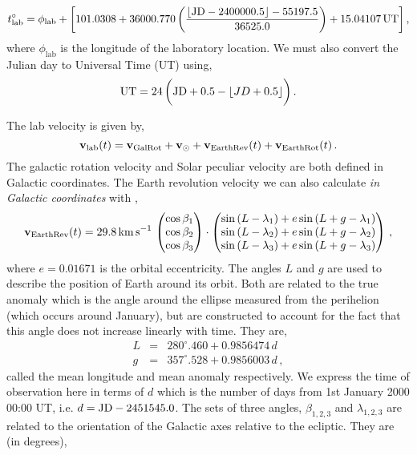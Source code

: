 \begin{equation}
 t^\circ_\textrm{lab} = \phi_\textrm{lab} + \bigg[101.0308
		+ 36000.770\left(\frac{\lfloor\textrm{JD} - 2400000.5\rfloor-55197.5}{36525.0}\right)
		+ 15.04107 \, \textrm{UT}\bigg] \, , \nonumber
\end{equation}
where $\phi_\textrm{lab}$ is the longitude of the laboratory location. We must also convert the Julian day to Universal Time (UT) using,
\begin{equation}
 \textrm{UT} = 24\,\bigg(\textrm{JD}+0.5-\lfloor JD+0.5\rfloor\bigg) \, .
\end{equation}

The lab velocity is given by,
\begin{equation}
\textbf{v}_\textrm{lab}(t) = {\bf v}_{\rm GalRot} + {\bf v}_\odot + {\bf v}_{\rm EarthRev}(t) + {\bf v}_{\rm EarthRot}(t) \, .
\end{equation}
The galactic rotation velocity and Solar peculiar velocity are both defined in Galactic coordinates. The Earth revolution velocity we can also calculate {\it in Galactic coordinates} with \cite{McCabe:2013kea},
\begin{equation}
\textbf{v}_\textrm{\rm EarthRev}(t) = 29.8 {\rm \, km \, s}^{-1} \, \begin{pmatrix} \cos{\beta_1} \\ \cos{\beta_2} \\ \cos{\beta_3} \end{pmatrix} \cdot
\begin{pmatrix}
\sin{(L-\lambda_1)} + e\sin{(L+g-\lambda_1)}\\
\sin{(L-\lambda_2)} + e\sin{(L+g-\lambda_2)}\\
\sin{(L-\lambda_3)} + e\sin{(L+g-\lambda_3)}
\end{pmatrix} \, ,
\end{equation}
where $e = 0.01671$ is the orbital eccentricity. The angles $L$ and $g$ are used to describe the position of Earth around its orbit. Both are related to the true anomaly which is the angle around the ellipse measured from the perihelion (which occurs around January), but are constructed to account for the fact that this angle does not increase linearly with time. They are,
\begin{eqnarray}\label{eq:earthorbit}
L &=& 280^\circ .460 +  0.9856474 \, d \,  \\
g &=& 357^\circ .528 + 0.9856003 \, d \, ,
\end{eqnarray}
called the mean longitude and mean anomaly respectively. We express the time of observation here in terms of $d$ which is the number of days from 1st January 2000 00:00 UT, i.e. $d = {\rm JD} - 2451545.0$. The sets of three angles, $\beta_{1,2,3}$ and $\lambda_{1,2,3}$ are related to the orientation of the Galactic axes relative to the ecliptic. They are (in degrees),
